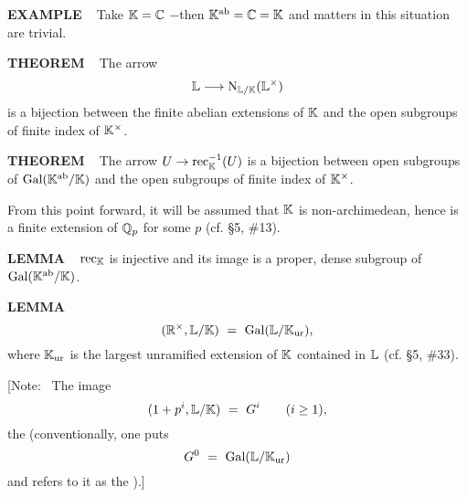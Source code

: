 \vspace{0.1cm}

\begin{x}{\small\bf EXAMPLE} \ %
Take $\mathbb{K} = \mathbb{C}$ $-$then $\mathbb{K}^{\text{ab}} = \mathbb{C} = \mathbb{K}$ and matters in this situation are trivial.
\end{x}
\vspace{0.1cm}

\begin{x}{\small\bf THEOREM} \ %
The arrow 
\[
\mathbb{L} \longrightarrow \text{N}_{\mathbb{L}/\mathbb{K}}(\mathbb{L}^\times)
\]
is a bijection between the finite abelian extensions of $\mathbb{K}$ and the open subgroups of finite index of $\mathbb{K}^\times$.
\end{x}
\vspace{0.1cm}

\begin{x}{\small\bf THEOREM} \ %
The arrow $U \rightarrow \text{rec}_{\mathbb{K}}^{-1}(U)$ is a bijection between open subgroups of $\text{Gal}(\mathbb{K}^{\text{ab}}/\mathbb{K})$ and the open subgroups of finite index of $\mathbb{K}^\times$.
\end{x}

\vspace{0.1cm}

From this point forward, it will be assumed that $\mathbb{K}$ is non-archimedean, hence is a finite extension of $\mathbb{Q}_p$ for some 
$p$ (cf. \S5, \#13).

\vspace{0.2cm}

\begin{x}{\small\bf LEMMA} \ %
$\text{rec}_{\mathbb{K}}$ is injective and its image is a  proper, dense subgroup of $\text{Gal}(\mathbb{K}^{\text{ab}}/\mathbb{K})$.
\end{x}

\vspace{0.1cm}

\begin{x}{\small\bf LEMMA} \ %
\[
(\R^\times,\LL/\K) \ = \ \Gal(\LL/\K_\ur),
\]
where $\mathbb{K}_{\text{ur}}$ is the largest unramified extension of $\mathbb{K}$ contained in $\mathbb{L}$ (cf. \S5, \#33).
\end{x}
\vspace{0.1cm}

[Note: \ The image
\[
(1 + p^i,\LL/\K) \ = \ G^i \qquad (i \geq 1),
\]
the 
(conventionally, one puts 
\[
G^0 \ = \ \text{Gal}(\mathbb{L}/\mathbb{K}_{\text{ur}})
\]
and refers to it as the 
).]
\vspace{0.3cm}

